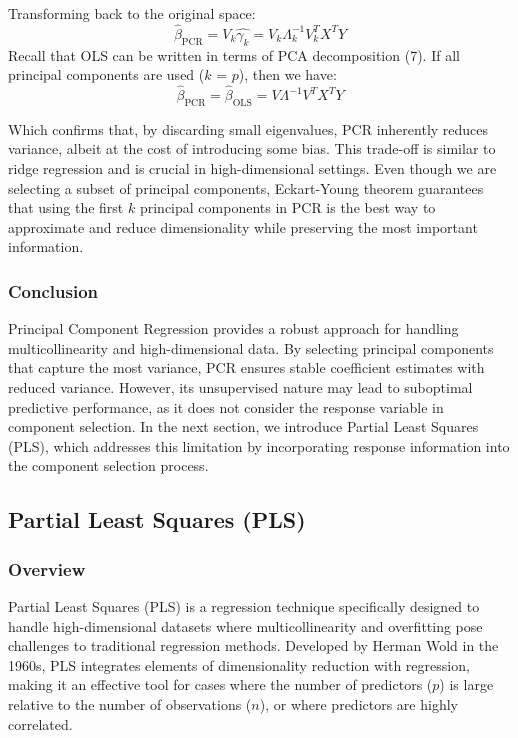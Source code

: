 \documentclass[11pt,twoside,a4paper]{article}
\begin{document}
Transforming back to the original space:
\begin{equation}
\hat{\beta}_{\text{PCR}} = V_k \hat{\gamma_k} = V_k \Lambda_k^{-1} V_k^T X^T Y
\end{equation}
Recall that OLS can be written in terms of PCA decomposition (7). If all principal components are used (\( k \) = \( p \)), then we have:
\begin{equation}
\hat{\beta}_{\text{PCR}} = \hat{\beta}_{\text{OLS}} = V \Lambda^{-1} V^T X^T Y
\end{equation}

Which confirms that, by discarding small eigenvalues, PCR inherently reduces variance, albeit at the cost of introducing some bias. This trade-off is similar to ridge regression and is crucial in high-dimensional settings. Even though we are selecting a subset of principal components, Eckart-Young theorem guarantees that using the first \( k \) principal components in PCR is the best way to approximate and reduce dimensionality while preserving the most important information.

\subsubsection{Conclusion}
Principal Component Regression provides a robust approach for handling multicollinearity and high-dimensional data. By selecting principal components that capture the most variance, PCR ensures stable coefficient estimates with reduced variance. However, its unsupervised nature may lead to suboptimal predictive performance, as it does not consider the response variable in component selection. In the next section, we introduce Partial Least Squares (PLS), which addresses this limitation by incorporating response information into the component selection process.

\subsection{Partial Least Squares (PLS)}

\subsubsection{Overview}
Partial Least Squares (PLS) is a regression technique specifically designed to handle high-dimensional datasets where multicollinearity and overfitting pose challenges to traditional regression methods. Developed by Herman Wold in the 1960s, PLS integrates elements of dimensionality reduction with regression, making it an effective tool for cases where the number of predictors (\( p \)) is large relative to the number of observations (\( n \)), or where predictors are highly correlated.
\end{document}
